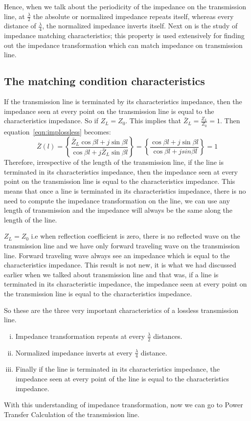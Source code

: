 Hence, when we talk about the periodicity of the impedance on the transmission line, at $\frac{\lambda}{2}$ the absolute or normalized impedance repeats itself, whereas every distance of $\frac{\lambda}{4}$, the normalized impedance inverts itself. Next on is the study of impedance matching characteristics; this property is used extensively for finding out the impedance transformation which can match impedance on transmission line.

\subsection{The matching condition characteristics}
If the transmission line is terminated by its characteristics impedance, then the impedance seen at every point on the transmission line is equal to the characteristics impedance. So if $Z_L=Z_0$. This implies that $\bar{Z}_L= \frac{Z_L}{Z_0}=1$. Then equation~\ref{eqn:implossless} becomes:
\begin{dmath*}
\bar{Z}(l) = \left\lbrace\frac{\bar{Z}_L\cos\beta l + j\sin\beta l}{\cos\beta l + j\bar{Z}_L\sin\beta l}\right\rbrace = \left\lbrace \frac{\cos\beta l + j\sin\beta l}{\cos\beta l + jsin\beta l}\right\rbrace = 1
\end{dmath*}
Therefore, irrespective of the length of the transmission line, if the line is terminated in its characteristics impedance, then the impedance seen at every point on the transmission line is equal to the characteristics impedance. This means that once a line is terminated in its characteristics impedance, there is no need to compute the impedance transformation on the line, we can use any length of transmission and the impedance will always be the same along the length of the line. 

$Z_L=Z_0$ i.e when reflection coefficient is zero, there is no reflected wave on the transmission line and we have only forward traveling wave on the transmission line. Forward traveling wave always see an impedance which is equal to the characteristics impedance. This result is not new, it is what we had discussed earlier when we talked about transmission line and that was, if a line is terminated in its characteristic impedance, the impedance seen at every point on the transmission line is equal to the characteristics impedance. 

So these are the three very important characteristics of a lossless transmission line.
\begin{enumerate}[(i)]
\item Impedance transformation repeats at every $\frac{\lambda}{2}$ distances.
\item Normalized impedance inverts at every $\frac{\lambda}{4}$ distance.
\item Finally if the line is terminated in its characteristics impedance, the impedance seen at every point of the line is equal to the characteristics impedance.
\end{enumerate}
With this understanding of impedance transformation, now we can go to Power Transfer Calculation of the transmission line.

